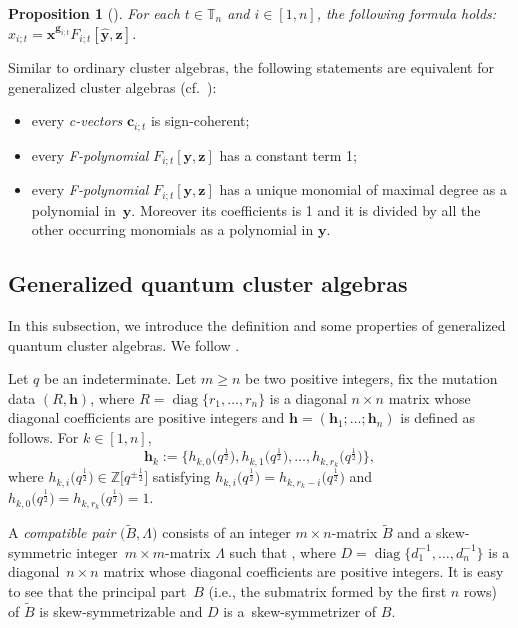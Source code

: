 \documentclass[pdftex]{sigma}
\numberwithin{equation}{section}
\newtheorem{Proposition}[Theorem]{Proposition}
 { \theoremstyle{definition}
\newtheorem{Definition}[Theorem]{Definition}
\newtheorem{Note}[Theorem]{Note}
\newtheorem{Example}[Theorem]{Example}
\newtheorem{Remark}[Theorem]{Remark} }
\begin{document}
\begin{Proposition}[{\cite[Theorem 3.23]{Nakanishi14}}]\label{p:separation-formula-gca}
 For each $t\in \mathbb{T}_n$ and $i\in[1,n]$, the following formula holds:
 $
 x_{i;t}=\mathbf{x}^{\mathbf{g}_{i;t}}F_{i;t}[\hat{\mathbf{y}},\mathbf{z}]$.
\end{Proposition}
\begin{Remark}
 Similar to ordinary cluster algebras, the following statements are equivalent for generalized cluster algebras (cf.\ \cite[Proposition 3.19]{Nakanishi14}):
 \begin{itemize}\itemsep=0pt
 \item every {\it c-vectors} $\mathbf{c}_{i;t}$ is sign-coherent;
 \item every {\it F-polynomial} $F_{i;t}[\mathbf{y},\mathbf{z}]$ has a constant term 1;
 \item every {\it F-polynomial} $F_{i;t}[\mathbf{y},\mathbf{z}]$ has a unique monomial of maximal degree as a polynomial in~$\mathbf{y}$. Moreover its coefficients is 1 and it is divided by all the other occurring monomials as a polynomial in $\mathbf{y}$.
\end{itemize}
\end{Remark}

\subsection{Generalized quantum cluster algebras}\label{ss:gqca}
In this subsection, we introduce the definition and some properties of generalized quantum cluster algebras. We follow \cite{BCDX2018}.

Let $q$ be an indeterminate. Let $m\ge n$ be two positive integers, fix the mutation data $(R,\mathbf{h})$, where $R=\operatorname{diag}\{r_1,\dots,r_n\}$ is a diagonal $n\times n$ matrix whose diagonal coefficients are positive integers and $\mathbf{h}=(\mathbf{h}_1;\dots;\mathbf{h}_n)$ is defined as follows.
For $k\in[1,n]$,
\[
\mathbf{h}_{k}:=\bigl\{h_{k,0}\bigl(q^{\frac{1}{2}}\bigr),h_{k,1}\bigl(q^{\frac{1}{2}}\bigr),\dots,h_{k,r_{k}}\bigl(q^{\frac{1}{2}}\bigr)\bigr\},
\]
where $h_{k,i}\bigl(q^{\frac{1}{2}}\bigr)\in\mathbb{Z}\big[q^{\pm\frac{1}{2}}\big]$ satisfying $h_{k,i}\bigl(q^{\frac{1}{2}}\bigr)=h_{k,r_{k}-i}\bigl(q^{\frac{1}{2}}\bigr)$
and $h_{k,0}\bigl(q^{\frac{1}{2}}\bigr)=h_{k,r_{k}}\bigl(q^{\frac{1}{2}}\bigr)=1$.

A {\it compatible pair} $\bigl(\tilde{B}, \Lambda\bigr)$ consists of an integer $m\times n$-matrix $\tilde{B}$ and a skew-symmetric integer~${m\times m}$-matrix $\Lambda$ such that
,
where $D=\operatorname{diag}\bigl\{d_1^{-1},\dots, d_n^{-1}\bigr\}$ is a diagonal~${n\times n}$ matrix whose diagonal coefficients are positive integers. It is easy to see that the principal part~$B$ (i.e., the submatrix formed by the first $n$ rows) of $\tilde{B}$ is skew-symmetrizable and $D$ is a~skew-symmetrizer of $B$.
\end{document}
